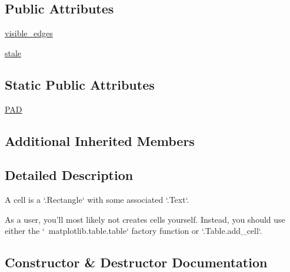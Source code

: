 \subsection*{Public Attributes}
\begin{DoxyCompactItemize}
\item 
\hyperlink{classmatplotlib_1_1table_1_1Cell_a9638e7bf569e84977d7b73bc72b453dd}{visible\+\_\+edges}
\item 
\hyperlink{classmatplotlib_1_1table_1_1Cell_a5a07eca7c5ae4ea6feffdd85d2ac37c1}{stale}
\end{DoxyCompactItemize}
\subsection*{Static Public Attributes}
\begin{DoxyCompactItemize}
\item 
\hyperlink{classmatplotlib_1_1table_1_1Cell_aeb244235d46f60ea85169467a83fca8f}{P\+AD}
\end{DoxyCompactItemize}
\subsection*{Additional Inherited Members}


\subsection{Detailed Description}
\begin{DoxyVerb}A cell is a `.Rectangle` with some associated `.Text`.

As a user, you'll most likely not creates cells yourself. Instead, you
should use either the `~matplotlib.table.table` factory function or
`.Table.add_cell`.
\end{DoxyVerb}
 

\subsection{Constructor \& Destructor Documentation}
\mbox{\label{classmatplotlib_1_1table_1_1Cell_afdc76038b216134e1153f38f680fa94e}} 
